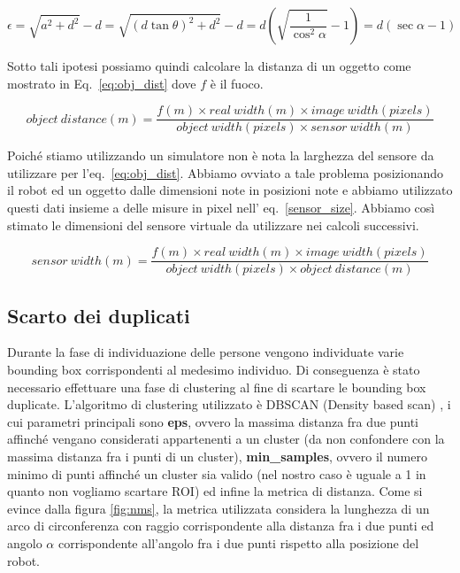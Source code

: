 \documentclass[a4paper]{article}
\begin{document}
	\begin{equation}
	\epsilon = 
	\sqrt{a^2+d^2} - d =
	\sqrt{(d\tan \theta )^2+d^2}-d =
	d\left( \sqrt{\frac{1}{\cos ^2 \alpha}}-1 \right) =
	d \left( \sec \alpha -1 \right) 
	\label{eq:max_err}
	\end{equation}
	
	Sotto tali ipotesi possiamo quindi calcolare la distanza di un oggetto come
	mostrato in Eq.~\ref{eq:obj_dist} dove $f$ è il fuoco.
	
	\begin{equation}\label{eq:obj_dist}
	object~distance(m) = 
	\frac{f(m) \times real~width(m) \times image~width(pixels)}
	{object~width(pixels) \times sensor~width(m)}
	\end{equation}
	
	Poiché stiamo utilizzando un simulatore non è nota la larghezza del sensore
	da utilizzare per l'eq.~\ref{eq:obj_dist}. Abbiamo ovviato a tale problema
	posizionando il robot ed un oggetto dalle dimensioni note in posizioni note
	e abbiamo utilizzato questi dati insieme a delle misure in pixel nell'
	eq.~\ref{sensor_size}. Abbiamo così stimato le dimensioni del sensore
	virtuale da utilizzare nei calcoli successivi.

	\begin{equation}\label{sensor_size}
	sensor~width(m) = 
	\frac{f(m) \times real~width(m) \times image~width(pixels)}
	{object~width(pixels) \times object~distance(m)}
	\end{equation}
	
	\subsection{Scarto dei duplicati}\label{subsec:Scarto-dei-duplicati}
	Durante la fase di individuazione delle persone vengono individuate varie
	bounding box corrispondenti al medesimo individuo. Di conseguenza è stato
	necessario effettuare una fase di clustering al fine di scartare le
	bounding box duplicate. L'algoritmo di clustering utilizzato è DBSCAN
	(Density based scan) \cite{dbscan}, i cui parametri principali sono
	\textbf{eps}, ovvero la massima distanza fra due punti affinché vengano
	considerati appartenenti a un cluster (da non confondere con la massima
	distanza fra i punti di un cluster), \textbf{min\_samples}, ovvero il
	numero minimo di punti affinché un cluster sia valido (nel nostro caso è
	uguale a 1 in quanto non vogliamo scartare ROI) ed infine la metrica di
	distanza.  Come si evince dalla figura \ref{fig:nms}, la metrica utilizzata
	considera la lunghezza di un arco di circonferenza con raggio
	corrispondente alla distanza fra i due punti ed angolo $\alpha$
	corrispondente  all'angolo fra i due punti rispetto alla posizione del
	robot.
	
\end{document}
